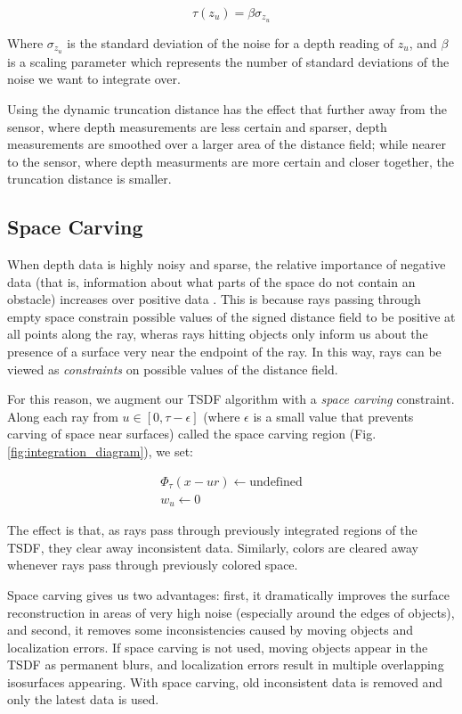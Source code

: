 \documentclass[conference,10pt]{IEEEtran}
\begin{document}
$$ \tau(z_u) = \beta\sigma_{z_u}$$

Where $\sigma_{z_u}$ is the standard deviation of the noise for a depth reading
of $z_u$, and $\beta$ is a scaling parameter which represents the number of
standard deviations of the noise we want to integrate over.

Using the dynamic truncation distance has the effect that further away from the
sensor, where depth measurements are less certain and sparser, depth
measurements are smoothed over a larger area of the distance field; while nearer
to the sensor, where depth measurments are more certain and closer together, the
truncation distance is smaller.

\subsection{Space Carving}
\label{section:carving}
When depth data is highly noisy and sparse, the relative importance of negative
data (that is, information about what parts of the space do not contain an
obstacle) increases over positive data \cite{Klingensmith2014}. This is because
rays passing through empty space constrain possible values of the signed
distance field to be positive at all points along the ray, wheras rays hitting
objects only inform us about the presence of a surface very near the endpoint of
the ray. In this way, rays can be viewed as \textit{constraints} on possible
values of the distance field. 

For this reason, we augment our TSDF algorithm with a \textit{space carving}
constraint. Along each ray from $u \in [0, \tau - \epsilon]$ (where $\epsilon$
is a small value that prevents carving of space near surfaces) called the space
carving region (Fig. \ref{fig:integration_diagram}), we set:

\begin{align*}
\Phi_{\tau}(x - ur) \gets \text{undefined}
\\
%
w_u \gets 0
\end{align*}

\noindent  The effect is that, as rays pass through previously integrated
regions of the TSDF, they clear away inconsistent data. Similarly, colors are
cleared away whenever rays pass through previously colored space.

Space carving gives us two advantages: first, it dramatically improves the
surface reconstruction in areas of very high noise (especially around the edges
of objects), and second, it removes some inconsistencies caused by moving
objects and localization errors. If space carving is not used, moving objects
appear in the TSDF as permanent blurs, and localization errors result in
multiple overlapping isosurfaces appearing. With space carving, old inconsistent
data is removed and only the latest data is used.
\end{document}
